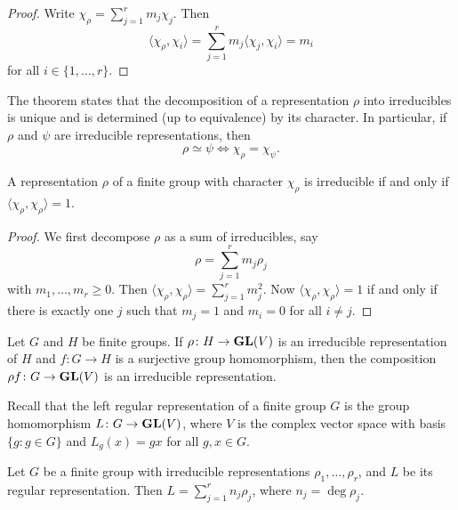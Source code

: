 \begin{proof}
    Write $\chi_\rho=\sum_{j=1}^rm_j\chi_j$. Then
    \[
    \langle\chi_\rho,\chi_i\rangle=\sum_{j=1}^rm_j\langle\chi_j,\chi_i\rangle=m_i
    \]
    for all $i\in\{1,\dots,r\}$.
\end{proof}

The theorem states that the decomposition of a representation $\rho$ into irreducibles 
is unique and is determined (up to equivalence) by its character. In particular, if $\rho$ and 
$\psi$
are irreducible representations, then
\[
    \rho\simeq\psi\Longleftrightarrow\chi_\rho=\chi_\psi.
\]

\begin{corollary}
    A representation $\rho$ of a finite group with character $\chi_\rho$ is irreducible if and only if $\langle\chi_\rho,\chi_\rho\rangle=1$.
\end{corollary}

\begin{proof}
    We first decompose $\rho$ as a sum of irreducibles, say \[
    \rho=\sum_{j=1}^rm_j\rho_j
    \]
    with $m_1,\dots,m_r\geq0$. Then
    $\langle\chi_\rho,\chi_\rho\rangle=\sum_{j=1}^rm_j^2$. Now $\langle\chi_\rho,\chi_\rho\rangle=1$ if and only if
    there is exactly one $j$ such that $m_j=1$ and $m_i=0$ for all $i\ne j$.  
\end{proof}

\begin{exercise}
    Let $G$ and $H$ be finite groups. 
    If $\rho\colon H\to\mathbf{GL}(V)$ is an irreducible
    representation of $H$ and 
    $f\colon G\to H$ is a surjective group homomorphism, then the composition $\rho f\colon G\to\mathbf{GL}(V)$ is an irreducible representation. 
\end{exercise}

Recall that the left regular representation of a finite group $G$
is the group homomorphism $L\colon G\to \mathbf{GL}(V)$, where $V$ is the complex vector space
with basis $\{g:g\in G\}$ and $L_g(x)=gx$ for all $g,x\in G$. 

\begin{theorem}
    Let $G$ be a finite group with irreducible representations $\rho_1,\dots,\rho_r$, and $L$ be its regular representation. 
    Then $L=\sum_{j=1}^rn_j\rho_j$, where $n_j=\deg\rho_j$. 
\end{theorem}


